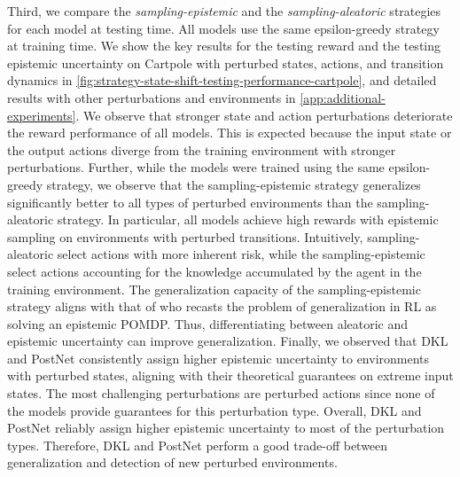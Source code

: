 %
%


Third, we compare the \emph{sampling-epistemic} and the \emph{sampling-aleatoric} strategies for each model at testing time. All models use the same epsilon-greedy strategy at training time. We show the key results for the testing reward and the testing epistemic uncertainty on Cartpole with perturbed states, actions, and transition dynamics in \cref{fig:strategy-state-shift-testing-performance-cartpole}, and detailed results with other perturbations and environments 
in \cref{app:additional-experiments}. We observe that stronger state and action perturbations deteriorate the reward performance of all models. This is expected because the input state or the output actions diverge from the training environment with stronger perturbations. Further, while the models were trained using the same epsilon-greedy strategy, we observe that the sampling-epistemic strategy generalizes significantly better to all types of perturbed environments than the sampling-aleatoric strategy. In particular, all models achieve high rewards with epistemic sampling on environments with perturbed transitions. Intuitively, sampling-aleatoric select actions with more inherent risk, while the sampling-epistemic select actions accounting for the knowledge accumulated by the agent in the training environment. The generalization capacity of the sampling-epistemic strategy aligns with that of \citet{epistemic-pomdp} who recasts the problem of generalization in RL as solving an epistemic POMDP. Thus, differentiating between aleatoric and epistemic uncertainty can improve generalization. Finally, we observed that DKL and PostNet consistently assign higher epistemic uncertainty to environments with perturbed states, aligning with their theoretical guarantees on extreme input states. The most challenging perturbations are perturbed actions since none of the models provide guarantees for this perturbation type. Overall, DKL and PostNet reliably assign higher epistemic uncertainty to most of the perturbation types. Therefore, DKL and PostNet perform a good trade-off between generalization and detection of new perturbed environments.

 
%
%